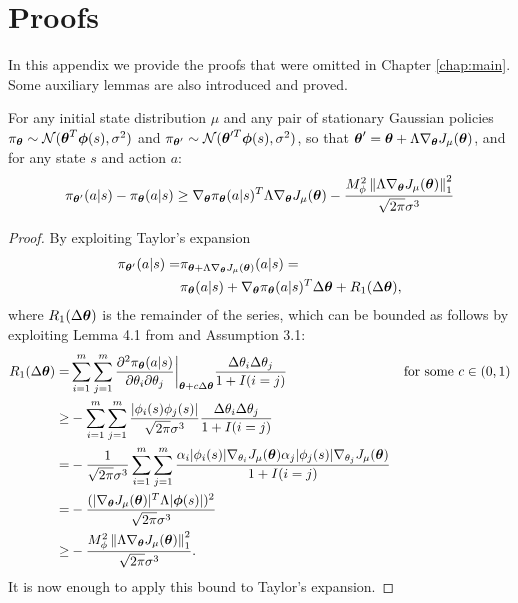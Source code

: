 \chapter{Proofs}\label{app:proofs}
In this appendix we provide the proofs that were omitted in Chapter \ref{chap:main}. Some auxiliary lemmas are also introduced and proved.

\begin{lemma}\label{aux:1}
For any initial state distribution $\mu$ and any pair of stationary Gaussian policies $\pi_{\vtheta} \sim \mathcal{N}(\vtheta^T\boldsymbol{\phi}(s),\sigma^2)$ and $\pi_{\vtheta'} \sim \mathcal{N}(\vtheta'^T\boldsymbol{\phi}(s),\sigma^2)$, so that $\vtheta'=\vtheta+\Lambda\gradJ{\vtheta}$, and for any state $s$ and action $a$:
\[
\pi_{\vtheta'}(a|s) - \pi_{\vtheta}(a|s) \geq \nabla_{\vtheta}\pi_{\vtheta}(a|s)^T\Lambda\gradJ{\vtheta} 
	- \frac{M_{\phi}^2\norm[1]{\Lambda\gradJ{\vtheta}}^2}{\sqrt{2\pi}\sigma^3}
\]
\end{lemma}

\begin{proof}
By exploiting Taylor's expansion
\begin{align*}
\pi_{\vtheta'}(a|s) = & \pi_{\vtheta + \Lambda\gradJ{\vtheta}}(a|s) = \\
	& \pi_{\vtheta}(a|s) + \nabla_{\vtheta}\pi_{\vtheta}(a|s)^T\Delta\vtheta+R_1(\Delta\vtheta),
\end{align*}
where $R_1(\Delta\vtheta)$ is the remainder of the series, which can be bounded as follows by exploiting Lemma 4.1 from \cite{NIPS2013_5186} and Assumption 3.1:
\begin{align*}
R_1(\Delta\vtheta) = & \sum\limits_{i=1}^m\sum\limits_{j=1}^m
\frac{\partial^2\pi_{\vtheta}(a|s)}{\partial\theta_i\partial\theta_j} \bigg|_{\vtheta+c\Delta\vtheta} \frac{\Delta\theta_i\Delta\theta_j}{1+I(i=j)} & \text{for some $c \in (0,1)$} \\
	\geq & - \sum\limits_{i=1}^m\sum\limits_{j=1}^m \frac{|\phi_i(s)\phi_j(s)|}{\sqrt{2\pi}\sigma^3}
	\frac{\Delta\theta_i\Delta\theta_j}{1+I(i=j)} \\
	= & -\frac{1}{\sqrt{2\pi}\sigma^3}\sum\limits_{i=1}^m\sum\limits_{j=1}^m
	\frac{\alpha_i|\phi_i(s)|\gradJ{\theta_i}\alpha_j|\phi_j(s)|\gradJ{\theta_j}}{1+I(i=j)} \\
	= & - \frac{(|\gradJ{\vtheta}|^T\Lambda|\vphi(s)|)^2}{\sqrt{2\pi}\sigma^3} \\
	\geq & - \frac{M_{\phi}^2\norm[1]{\Lambda\gradJ{\vtheta}}^2}{\sqrt{2\pi}\sigma^3}.
\end{align*}
It is now enough to apply this bound to Taylor's expansion.
\end{proof}

